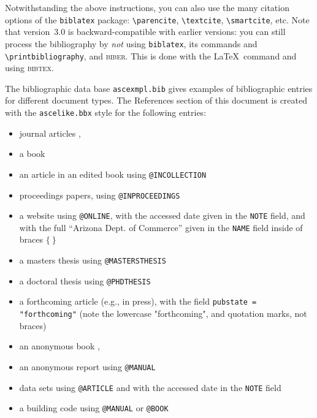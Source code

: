 \documentclass[Proceedings]{ascelike}
\begin{document}
%
\par
Notwithstanding the above instructions,
you can also use the many citation options of
the \texttt{biblatex} package:
\verb+\parencite+, \verb+\textcite+, \verb+\smartcite+, etc.
%
Note that version~3.0 is backward-compatible 
with earlier versions:
you can still process the bibliography by \emph{not} using
\texttt{biblatex}, its commands \verb++
and \verb+\printbibliography+, and \textsc{biber}.
This is done with the \LaTeX\ command \verb++
and using \textsc{bibtex}.
%
\par
The bibliographic data base \texttt{ascexmpl.bib}
gives examples of bibliographic entries for different document types.
The References section of this document is created with
the \texttt{ascelike.bbx} style for the following entries:
\begin{itemize}
\item journal articles \cite{Stahl:2004a,Pennoni:1992a},
\item a book \cite{Goossens:1994a,Evans:2003a}
\item an article in an edited book using 
      \texttt{@INCOLLECTION} \cite{Zadeh:1981a}
\item proceedings papers, using \texttt{@INPROCEEDINGS} 
      \cite{Eshenaur:1991a,Garrett:2003a}
\item a website using \texttt{@ONLINE},
      with the accessed date given in the \texttt{NOTE} field,
      and with the full ``Arizona Dept. of Commerce'' 
      given in the \texttt{NAME} field
      inside of braces $\{\:\}$
      \cite{Arizona:2005a,Foucher:2017a}
\item a masters thesis using \texttt{@MASTERSTHESIS} \cite{Sotiropulos:1991a}
\item a doctoral thesis using \texttt{@PHDTHESIS} \cite{Chang:1987a}
\item a forthcoming article (e.g., in press), with the field
     \texttt{pubstate = "forthcoming"}
     (note the lowercase "forthcoming", and quotation marks,
     not braces) \cite{Dasgupta:2008a,Han}
\item an anonymous book \cite{Moody:1988a},
\item an anonymous report using \texttt{@MANUAL} \cite{FHWA:1991a}
\item data sets using \texttt{@ARTICLE} and with the accessed date in the
      \texttt{NOTE} field \cite{Ansolabehere:2014a,Thernstrom:1986a}
\item a building code using \texttt{@MANUAL} or \texttt{@BOOK} \cite{ACI:1989a}

\end{itemize}
\end{document}

